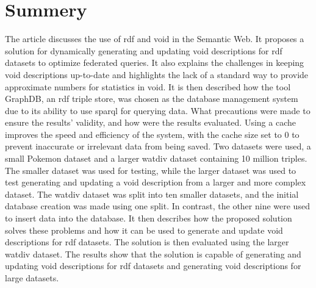 \section{Summery}\label{sec:summery}
The article discusses the use of \gls{rdf} and \gls{void} in the Semantic Web. It proposes a solution for dynamically generating and updating \gls{void} descriptions for \gls{rdf} datasets to optimize federated queries. It also explains the challenges in keeping \gls{void} descriptions up-to-date and highlights the lack of a standard way to provide approximate numbers for statistics in \gls{void}. It is then described how the tool GraphDB, an \gls{rdf} triple store, was chosen as the database management system due to its ability to use \gls{sparql} for querying data. What precautions were made to ensure the results' validity, and how were the results evaluated. Using a cache improves the speed and efficiency of the system, with the cache size set to 0 to prevent inaccurate or irrelevant data from being saved. Two datasets were used, a small Pokemon dataset and a larger \gls{watdiv} dataset containing 10 million triples. The smaller dataset was used for testing, while the larger dataset was used to test generating and updating a \gls{void} description from a larger and more complex dataset. The \gls{watdiv} dataset was split into ten smaller datasets, and the initial database creation was made using one split.
In contrast, the other nine were used to insert data into the database. It then describes how the proposed solution solves these problems and how it can be used to generate and update \gls{void} descriptions for \gls{rdf} datasets. The solution is then evaluated using the larger \gls{watdiv} dataset. The results show that the solution is capable of generating and updating \gls{void} descriptions for \gls{rdf} datasets and generating \gls{void} descriptions for large datasets.



